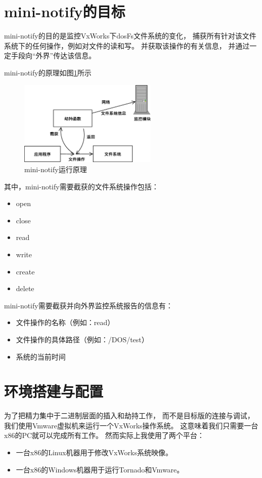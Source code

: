 \section{mini-notify的目标}

mini-notify的目的是监控VxWorks下dosFs文件系统的变化，
捕获所有针对该文件系统下的任何操作，例如对文件的读和写。
并获取该操作的有关信息，
并通过一定手段向“外界”传达该信息。

mini-notify的原理如图\ref{mini0}所示

\begin{figure}[h!]
    \centering
\includegraphics[width=0.59\textwidth]{figure/mini0.eps}
    \caption{mini-notify运行原理}
    \label{mini0}
\end{figure}

其中，mini-notify需要截获的文件系统操作包括：

\begin{itemize}
  \item open
  \item close
  \item read
  \item write
  \item create
  \item delete 
\end{itemize}

mini-notify需要截获并向外界监控系统报告的信息有：

\begin{itemize}
  \item 文件操作的名称（例如：read）
  \item 文件操作的具体路径（例如：/DOS/test）
  \item 系统的当前时间
\end{itemize}


\section{环境搭建与配置}

为了把精力集中于二进制层面的插入和劫持工作，
而不是目标版的连接与调试，
我们使用Vmware虚拟机来运行一个VxWorks操作系统。
这意味着我们只需要一台x86的PC就可以完成所有工作。
然而实际上我使用了两个平台：
\begin{itemize}
  \item 一台x86的Linux机器用于修改VxWorks系统映像。
  \item 一台x86的Windows机器用于运行Tornado和Vmware。
\end{itemize}

